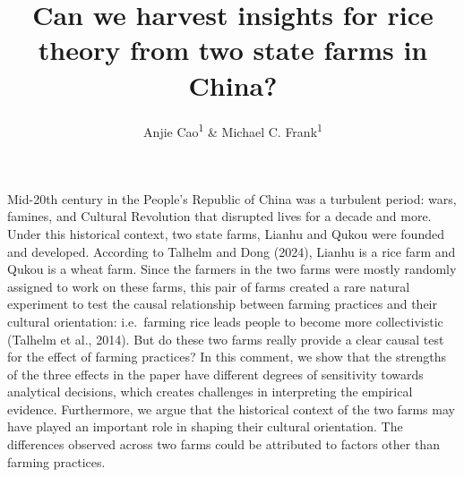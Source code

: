 \documentclass[
  man]{apa6}
\title{Can we harvest insights for rice theory from two state farms in China?}
\author{Anjie Cao\textsuperscript{1} \& Michael C. Frank\textsuperscript{1}}
\date{}
\affiliation{\vspace{0.5cm}\textsuperscript{1} Department of Psychology, Stanford University}
\begin{document}
\maketitle

Mid-20th century in the People's Republic of China was a turbulent period: wars, famines, and Cultural Revolution that disrupted lives for a decade and more. Under this historical context, two state farms, Lianhu and Qukou were founded and developed. According to Talhelm and Dong (2024), Lianhu is a rice farm and Qukou is a wheat farm. Since the farmers in the two farms were mostly randomly assigned to work on these farms, this pair of farms created a rare natural experiment to test the causal relationship between farming practices and their cultural orientation: i.e.~farming rice leads people to become more collectivistic (Talhelm et al., 2014). But do these two farms really provide a clear causal test for the effect of farming practices? In this comment, we show that the strengths of the three effects in the paper have different degrees of sensitivity towards analytical decisions, which creates challenges in interpreting the empirical evidence. Furthermore, we argue that the historical context of the two farms may have played an important role in shaping their cultural orientation. The differences observed across two farms could be attributed to factors other than farming practices.
\end{document}
